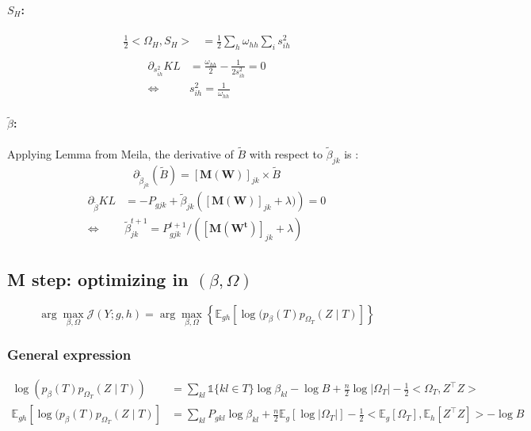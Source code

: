 \documentclass[11pt,a4paper]{article}
\newcommand{\argmax}{\arg\!\max}
\newcommand{\Esp}{\mathds{E}}
\begin{document}
\paragraph{$S_H$:}
\begin{align*}
\frac{1}{2}<\Omega_H, S_H> &= \frac{1}{2} \sum_h \omega_{hh}\sum_i s_{ih}^2\\
\end{align*}
\begin{align*}
\partial_{s_{ih}^2} KL &=  \frac{\omega_{hh}}{2}- \frac{1}{2s_{ih}^2} = 0\\
\iff & \boxed{s_{ih}^2 = \frac{1}{\omega_{hh}}}
\end{align*}


\paragraph{$\widetilde{\beta}$:}
Applying Lemma from Meila, the derivative of $\widetilde{B}$ with respect to $\widetilde{\beta}_{jk}$ is :
$$\partial_{\widetilde{\beta}_{jk}} (\widetilde{B}) = [\bm{M}(\bm{W})]_{jk} \times \widetilde{B} $$
\begin{align*}
\partial_{\widetilde{\beta}} KL &= -P_{gjk}+\widetilde{\beta}_{jk} \left( [\bm{M}(\bm{W})]_{jk} + \lambda)\right) =0\\
\iff & \boxed{\widetilde{\beta}_{jk}^{t+1} = P_{gjk}^{t+1}/\left([\bm{M}(\bm{W^t})]_{jk} + \lambda\right)}
\end{align*}
 
\subsection{M step: optimizing in $(\beta, \Omega)$}
 
$$ \argmax_{\beta, \Omega} \mathcal{J}(Y ; g,h) =\argmax_{\beta, \Omega} \left\{ \Esp_{gh} [\log (p_\beta(T)p_{\Omega_T}(Z\mid T) ]\right\} $$

\subsubsection{General expression}
\begin{align*}
\log (p_\beta(T)p_{\Omega_T}(Z\mid T))  &= \sum_{kl} \mathds{1}\{kl \in T\} \log \beta_{kl} - \log B + \frac{n}{2}\log |\Omega_T| - \frac{1}{2}<\Omega_T,Z^\intercal Z>\\
\Esp_{gh} [\log (p_\beta(T)p_{\Omega_T}(Z\mid T) ] &= \sum_{kl} P_{gkl} \log\beta_{kl} +\frac{n}{2} \Esp_g[\log |\Omega_T|] -\frac{1}{2} <\Esp_g [\Omega_T], \Esp_h[Z^\intercal Z]>- \log B
\end{align*}
\end{document}
